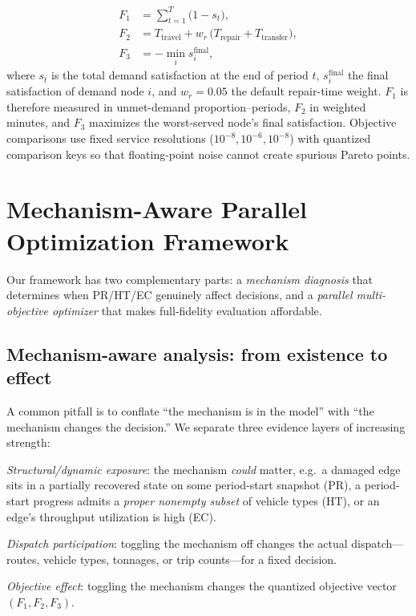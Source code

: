 \documentclass[10pt,conference,letterpaper]{IEEEtran}
\begin{document}
\begin{align}
F_1 &= \textstyle\sum_{t=1}^{T}\bigl(1 - s_t\bigr), \label{eq:f1}\\
F_2 &= T_{\text{travel}} + w_r\,
      \bigl(T_{\text{repair}} + T_{\text{transfer}}\bigr), \label{eq:f2}\\
F_3 &= -\min_{i} s_i^{\text{final}}, \label{eq:f3}
\end{align}
where $s_t$ is the total demand satisfaction at the end of period $t$,
$s_i^{\text{final}}$ the final satisfaction of demand node $i$, and
$w_r=0.05$ the default repair-time weight. $F_1$ is therefore measured in
unmet-demand proportion--periods, $F_2$ in weighted minutes, and $F_3$
maximizes the worst-served node's final satisfaction.
Objective comparisons use fixed
service resolutions ($10^{-8},10^{-6},10^{-8}$) with quantized comparison
keys so that floating-point noise cannot create spurious Pareto points.

\section{Mechanism-Aware Parallel Optimization Framework}
\label{sec:framework}

Our framework has two complementary parts: a \emph{mechanism diagnosis}
that determines when PR/HT/EC genuinely affect decisions, and a
\emph{parallel multi-objective optimizer} that makes full-fidelity
evaluation affordable.

\subsection{Mechanism-aware analysis: from existence to effect}
\label{sec:mechanism}

A common pitfall is to conflate ``the mechanism is in the model'' with
``the mechanism changes the decision.'' We separate three evidence
layers of increasing strength:

\begin{description}[nosep,leftmargin=1.2em]
\item[\textbf{L1 -- Exposure} (necessary, not sufficient).]
\emph{Structural/dynamic exposure}: the mechanism \emph{could} matter,
e.g.\ a damaged edge sits in a partially recovered state on some
period-start snapshot (PR), a period-start progress admits a
\emph{proper nonempty subset} of vehicle types (HT), or an edge's
throughput utilization is high (EC).
\item[\textbf{L2 -- Dispatch} (stronger).] \emph{Dispatch
participation}: toggling the mechanism off changes the actual
dispatch---routes, vehicle types, tonnages, or trip counts---for a
fixed decision.
\item[\textbf{L3 -- Objective} (definitional).] \emph{Objective
effect}: toggling the mechanism changes the quantized objective vector
$(F_1,F_2,F_3)$.
\end{description}
\end{document}
